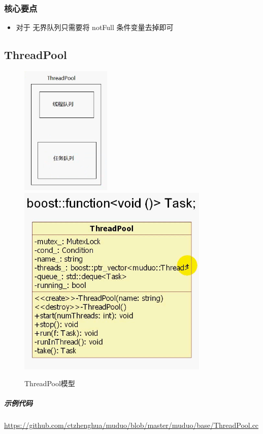 \documentclass[UTF8,a4paper,8pt]{ctexbook}
\begin{document}
			\subsubsection{核心要点}
				\begin{itemize}
					\item 对于 无界队列只需要将 notFull 条件变量去掉即可
				\end{itemize}
		\subsection{ThreadPool}
				\begin{figure}[htbp]
					\centering
					\includegraphics[scale= 0.7]{figure/ThreadPool.png}
					\includegraphics[scale= 0.5]{figure/muduoThreadPool.png}
					\caption{ThreadPool模型}
				\end{figure}
			
			\subparagraph{示例代码}\url{https://github.com/ctzhenghua/muduo/blob/master/muduo/base/ThreadPool.cc}
		
\end{document}
